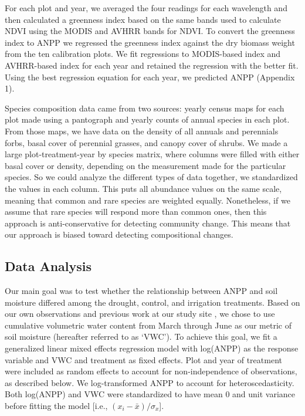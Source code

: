 \documentclass[fleqn,10pt,lineno]{wlpeerj} %
\begin{document}
For each plot and year, we averaged the four readings for each
wavelength and then calculated a greenness index based on the same bands
used to calculate NDVI using the MODIS and AVHRR bands for NDVI. To
convert the greenness index to ANPP we regressed the greenness index
against the dry biomass weight from the ten calibration plots. We fit
regressions to MODIS-based index and AVHRR-based index for each year and
retained the regression with the better fit. Using the best regression
equation for each year, we predicted ANPP (Appendix 1).

Species composition data came from two sources: yearly census maps for
each plot made using a pantograph \citep{Hill1920} and yearly counts of
annual species in each plot. From those maps, we have data on the
density of all annuals and perennials forbs, basal cover of perennial
grasses, and canopy cover of shrubs. We made a large plot-treatment-year
by species matrix, where columns were filled with either basal cover or
density, depending on the measurement made for the particular species.
So we could analyze the different types of data together, we
standardized the values in each column. This puts all abundance values
on the same scale, meaning that common and rare species are weighted
equally. Nonetheless, if we assume that rare species will respond more
than common ones, then this approach is anti-conservative for detecting
community change. This means that our approach is biased toward
detecting compositional changes.

\subsection{Data Analysis}\label{data-analysis}

Our main goal was to test whether the relationship between ANPP and soil
moisture differed among the drought, control, and irrigation treatments.
Based on our own observations and previous work at our study site
\citep{Blaisdell1958, Dalgleish2011, Adler2012}, we chose to use
cumulative volumetric water content from March through June as our
metric of soil moisture (hereafter referred to as `VWC'). To achieve
this goal, we fit a generalized linear mixed effects regression model
with log(ANPP) as the response variable and VWC and treatment as fixed
effects. Plot and year of treatment were included as random effects to
account for non-independence of observations, as described below. We
log-transformed ANPP to account for heteroscedasticity. Both log(ANPP)
and VWC were standardized to have mean 0 and unit variance before
fitting the model {[}i.e., \((x_i - \bar{x})/\sigma_x\){]}.
\end{document}

